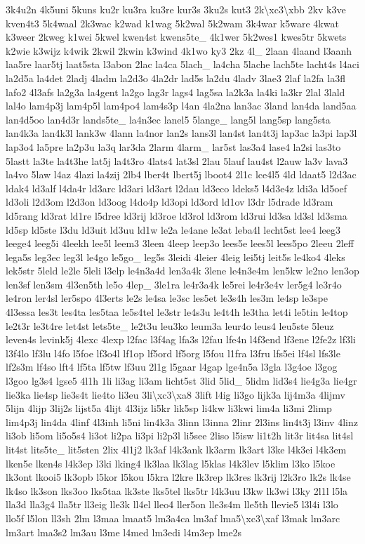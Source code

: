 \begin{DoxyCompactItemize}
3k4u2n 4k5uni 5kuns ku2r ku3ra ku3re kur3s 3ku2s kut3 2k\textbackslash{}xc3\textbackslash{}xbb 2kv k3ve kven4t3 5k4waal 2k3wac k2wad k1wag 5k2wal 5k2wam 3k4war k5ware 4kwat k3weer 2kweg k1wei 5kwel kwen4st kwens5te\-\_\- 4k1wer 5k2wes1 kwes5tr 5kwets k2wie k3wijz k4wik 2kwil 2kwin k3wind 4k1wo ky3 2kz 4l\-\_\- 2laan 4laand l3aanh laa5re laar5tj laat5sta l3abon 2lac la4ca 5lach\-\_\- la4cha 5lache lach5te lacht4s l4aci la2d5a la4det 2ladj 4ladm la2d3o 4la2dr lad5s la2du 4ladv 3lae3 2laf la2fa la3fl lafo2 4l3afs la2g3a la4gent la2go lag3r lags4 lag5sa la2k3a la4ki la3kr 2lal 3lald lal4o lam4p3j lam4p5l lam4po4 lam4s3p l4an 4la2na lan3ac 3land lan4da land5aa lan4d5oo lan4d3r lands5te\-\_\- la4n3ec lanel5 5lange\-\_\- lang5l lang5sp lang5sta lan4k3a lan4k3l lank3w 4lann la4nor lan2s lans3l lan4st lan4t3j lap3ac la3pi lap3l lap3o4 la5pre la2p3u la3q lar3da 2larm 4larm\-\_\- lar5st las3a4 lase4 la2si las3to 5lastt la3te la4t3he lat5j la4t3ro 4lats4 lat3sl 2lau 5lauf lau4st l2auw la3v lava3 la4vo 5law l4az 4lazi la4zij 2lb4 lber4t lbert5j lboot4 2l1c lce4l5 4ld ldaat5 l2d3ac ldak4 ld3alf l4da4r ld3arc ld3ari ld3art l2dau ld3eco ldeks5 l4d3e4z ldi3a ld5oef ld3oli l2d3om l2d3on ld3oog l4do4p ld3opi ld3ord ld1ov l3dr l5drade ld3ram ld5rang ld3rat ld1re l5dree ld3rij ld3roe ld3rol ld3rom ld3rui ld3sa ld3sl ld3sma ld5sp ld5ste l3du ld3uit ld3uu ld1w le2a le4ane le3at leba4l lecht5st lee4 leeg3 leege4 leeg5i 4leekh lee5l leem3 3leen 4leep leep3o lees5e lees5l lees5po 2leeu 2leff lega5s leg3ec leg3l le4go le5go\-\_\- leg5s 3leidi 4leier 4leig lei5tj leit5s le4ko4 4leks lek5str 5leld le2le 5leli l3elp le4n3a4d len3a4k 3lene le4n3e4m len5kw le2no len3op len3sf len3sm 4l3en5th le5o 4lep\-\_\- 3le1ra le4r3a4k le5rei le4r3e4v ler5g4 le3r4o le4ron ler4sl ler5spo 4l3erts le2s le4sa le3sc les5et le3s4h les3m le4sp le3spe 4l3essa les3t les4ta les5taa le5s4tel le3str le4s3u le4t4h le3tha let4i le5tin le4top le2t3r le3t4re let4st lets5te\-\_\- le2t3u leu3ko leum3a leur4o leus4 leu5ste 5leuz leven4s levink5j 4lexc 4lexp l2fac l3f4ag lfa3s l2fau lfe4n l4f3end lf3ene l2fe2z lf3li l3f4lo lf3lu l4fo l5foe lf3o4l lf1op lf5ord lf5org l5fou l1fra l3fru lfs5ei lf4sl lfs3le lf2s3m lf4so lft4 lf5ta lf5tw lf3uu 2l1g l5gaar l4gap lge4n5a l3gla l3g4oe l3gog l3goo lg3s4 lgse5 4l1h 1li li3ag li3am licht5st 3lid 5lid\-\_\- 5lidm lid3s4 lie4g3a lie4gr lie3ka lie4sp lie3s4t lie4to li3eu 3li\textbackslash{}xc3\textbackslash{}xa8 3lift l4ig li3go lijk3a lij4m3a 4lijmv 5lijn 4lijp 3lij2s lijst5a 4lijt 4l3ijz li5kr lik5sp li4kw li3kwi lim4a li3mi 2limp lim4p3j lin4da 4linf 4l3inh li5ni lin4k3a 3linn l3inna 2linr 2l3ins lin4t3j l3inv 4linz li3ob li5om li5o5s4 li3ot li2pa li3pi li2p3l li5see 2liso l5isw li1t2h lit3r lit4sa lit4sl lit4st lits5te\-\_\- lit5sten 2lix 4l1j2 lk3af l4k3ank lk3arm lk3art l3ke l4k3ei l4k3em lken5e lken4s l4k3ep l3ki lking4 lk3laa lk3lag l5klas l4k3lev l5klim l3ko l5koe lk3ont lkooi5 lk3opb l5kor l5kou l5kra l2kre lk3rep lk3res lk3rij l2k3ro lk2s lk4se lk4so lk3son lks3oo lks5taa lk3ste lks5tel lks5tr l4k3uu l3kw lk3wi l3ky 2l1l l5la lla3d lla3g4 lla5tr ll3eig lle3k ll4el lleo4 ller5on lle3s4m lle5th llevie5 l3l4i l3lo llo5f l5lon ll3sh 2lm l3maa lmaat5 lm3a4ca lm3af lma5\textbackslash{}xc3\textbackslash{}xaf l3mak lm3arc lm3art lma3s2 lm3au l3me l4med lm3edi l4m3ep lme2s 
\end{DoxyCompactItemize}

